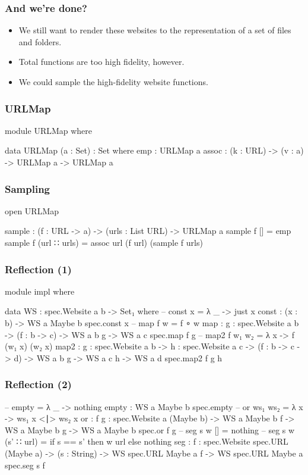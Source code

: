 \documentclass[aspectratio=169]{beamer}
\begin{document}
\begin{frame}
\frametitle{And we're done?}
\begin{itemize}
 \item We still want to render these websites to the representation of a set of files and folders.
 \item Total functions are too high fidelity, however.
 \item We could sample the high-fidelity website functions.
\end{itemize}
\end{frame}

\begin{frame}
\frametitle{URLMap}
\begin{code}
  module URLMap where
  
    data URLMap (a : Set) : Set where
      emp : URLMap a
      assoc : (k : URL) -> (v : a) -> URLMap a -> URLMap a
\end{code}
\end{frame}

\begin{frame}
\frametitle{Sampling}
\begin{code}
  open URLMap

  sample : (f : URL -> a) -> (urls : List URL) -> URLMap a
  sample f [] = emp
  sample f (url ∷ urls) = assoc url (f url) (sample f urls)
\end{code}
\end{frame}

\begin{frame}
\frametitle{Reflection (1)}
\begin{code}
module impl where

  data WS : {spec.Website a b} -> Set₁ where
    -- const x = λ _ -> just x
    const : (x : b) -> WS {a} {Maybe b} {spec.const x}
    -- map f w = f ∘ w
    map : {g : spec.Website a b} ->
          (f : b -> c) -> WS {a} {b} {g} -> WS {a} {c} {spec.map f g}
    -- map2 f w₁ w₂ = λ x -> f (w₁ x) (w₂ x)
    map2 : {g : spec.Website a b} -> {h : spec.Website a c}
           -> (f : b -> c -> d)
           -> WS {a} {b} {g}
           -> WS {a} {c} {h}
           -> WS {a} {d} {spec.map2 f g h}
\end{code}
\end{frame}

\begin{frame}
\frametitle{Reflection (2)}
\begin{code}
    -- empty = λ _ -> nothing
    empty : WS {a} {Maybe b} {spec.empty}
    -- or ws₁ ws₂ = λ x -> ws₁ x <∣> ws₂ x
    or : {f g : spec.Website a (Maybe b)}
         -> WS {a} {Maybe b} {f}
         -> WS {a} {Maybe b} {g}
         -> WS {a} {Maybe b} {spec.or f g}
    -- seg s w [] = nothing
    -- seg s w (s' ∷ url) = if s == s' then w url else nothing
    seg : {f : spec.Website spec.URL (Maybe a)}
          -> (s : String)
          -> WS {spec.URL} {Maybe a} {f}
          -> WS {spec.URL} {Maybe a} {spec.seg s f}
\end{code}
\end{frame}
\end{document}
